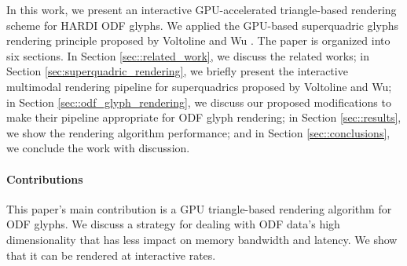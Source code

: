 \documentclass[twoside,twocolumn,10pt]{article}
\begin{document}
In this work, we present an interactive GPU-accelerated triangle-based rendering scheme for HARDI ODF glyphs. We applied the GPU-based superquadric glyphs rendering principle proposed by Voltoline and Wu \cite{voltoline2021}.
The paper is organized into six sections. In Section \ref{sec::related_work}, we discuss the related works; in Section \ref{sec:superquadric_rendering}, we briefly present the interactive multimodal rendering pipeline for superquadrics proposed by Voltoline and Wu; in Section \ref{sec::odf_glyph_rendering}, we discuss our proposed modifications to make their pipeline appropriate for ODF glyph rendering; in Section \ref{sec::results}, we show the rendering algorithm performance; and in Section \ref{sec::conclusions}, we conclude the work with discussion.

\paragraph*{\textbf{Contributions}}

This paper's main contribution is a GPU triangle-based rendering algorithm for ODF glyphs. We discuss a strategy for dealing with ODF data's high dimensionality that has less impact on memory bandwidth and latency. We show that it can be rendered at interactive rates.

\end{document}
